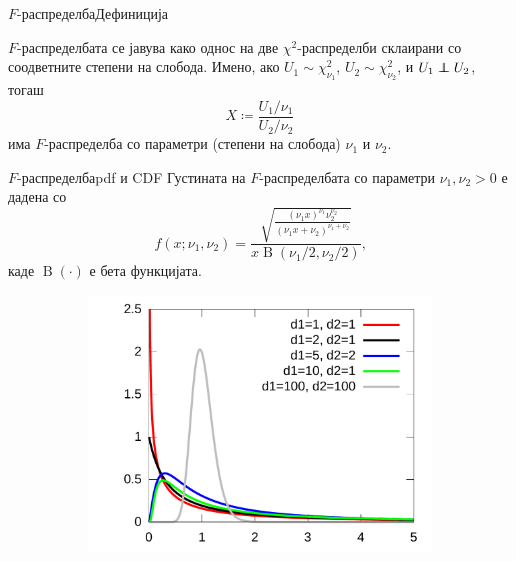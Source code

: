 \documentclass[hyperref={unicode}, xcolor={svgnames, table},
usepdftitle=false]{beamer}
\newcommand\independent{\protect\mathpalette{\protect\independenT}{\perp}}
\def\independenT#1#2{\mathrel{\rlap{$#1#2$}\mkern2mu{#1#2}}}
\theoremstyle{remark}
\begin{document}
\begin{frame}{\(F\)-распределба}{Дефиниција}
  \begin{definition}[\(F\)-распределба]
    \(F\)-распределбата се јавува како однос на две \(\chi^2\)-распределби
    склаирани со соодветните степени на слобода.  Имено, ако
    \(U_1 \sim \chi^2_{\nu_1}\), \(U_2 \sim \chi^2_{\nu_2}\), и
    \(U_1 \independent U_2\), тогаш
    \[
      X \coloneqq \frac{U_1 / {\nu_1}}{U_2 / {\nu_2}}
    \]
    има \(F\)-распределба со параметри (степени на слобода) \(\nu_1\) и
    \(\nu_2\).
  \end{definition}
\end{frame}

\begin{frame}{\(F\)-распределба}{pdf и CDF}
  Густината на \(F\)-распределбата со параметри \(\nu_1, \nu_2 > 0\) е дадена со
  \[
    f(x; \nu_1, \nu_2) = \frac{\sqrt{\frac{(\nu_1 x)^{\nu_1}
          \nu_2^{\nu_2}}{(\nu_1 x + \nu_2)^{\nu_1 + \nu_2}}}}{x
      \operatorname{B}(\nu_1 / {2}, \nu_2 / {2})}\text{,}
  \]
  каде \(\operatorname{B}(\cdot)\) е бета функцијата.
  \begin{figure}
    \centering
    \begin{subfigure}[b]{.45\linewidth}
      \includegraphics[width=\textwidth]{F_pdf.pdf}
    \end{subfigure}
    \begin{subfigure}[b]{.45\linewidth}

\end{subfigure}
\end{figure}
\end{frame}
\end{document}
